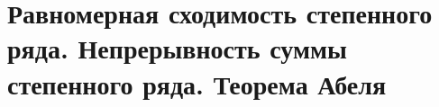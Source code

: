 \section{Равномерная сходимость степенного ряда. Непрерывность суммы степенного ряда. Теорема Абеля}
